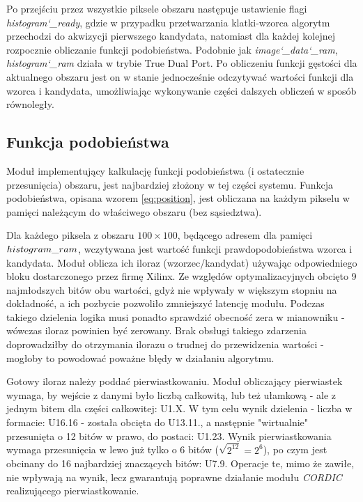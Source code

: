 Po przejściu przez wszystkie piksele obszaru następuje ustawienie flagi \textit{histogram\char`_ready}, gdzie w przypadku przetwarzania klatki-wzorca algorytm przechodzi do akwizycji pierwszego kandydata, natomiast dla każdej kolejnej rozpocznie obliczanie funkcji podobieństwa.
Podobnie jak \textit{image\char`_data\char`_ram}, \textit{histogram\char`_ram} działa w trybie True Dual Port. Po obliczeniu funkcji gęstości dla aktualnego obszaru jest on w stanie jednocześnie odczytywać wartości funkcji dla wzorca i kandydata, umożliwiając wykonywanie części dalszych obliczeń w sposób równoległy.

\subsection{Funkcja podobieństwa}
Moduł implementujący kalkulację funkcji podobieństwa (i ostatecznie przesunięcia) obszaru, jest najbardziej złożony w tej części systemu. Funkcja podobieństwa, opisana wzorem \ref{eq:position}, jest obliczana na każdym pikselu w pamięci należącym do właściwego obszaru (bez sąsiedztwa).

Dla każdego piksela z obszaru $100 \times 100$, będącego adresem dla pamięci $histogram\char`_ram$, wczytywana jest wartość funkcji prawdopodobieństwa wzorca i kandydata. Moduł oblicza ich iloraz (wzorzec/kandydat) używając odpowiedniego bloku dostarczonego przez firmę Xilinx. Ze względów optymalizacyjnych obcięto 9 najmłodszych bitów obu wartości, gdyż nie wpływały w większym stopniu na dokładność, a ich pozbycie pozwoliło zmniejszyć latencję modułu. Podczas takiego dzielenia logika musi ponadto sprawdzić obecność zera w mianowniku - wówczas iloraz powinien być zerowany. Brak obsługi takiego zdarzenia doprowadziłby do otrzymania ilorazu o trudnej do przewidzenia wartości - mogłoby to powodować poważne błędy w działaniu algorytmu. 

Gotowy iloraz należy poddać pierwiastkowaniu. Moduł obliczający pierwiastek wymaga, by wejście z danymi było liczbą całkowitą, lub  też ułamkową - ale z jednym bitem dla części całkowitej: U1.X. W tym celu wynik dzielenia - liczba w formacie: U16.16 - została obcięta do U13.11., a następnie "wirtualnie" przesunięta o 12 bitów w prawo, do postaci: U1.23. Wynik pierwiastkowania wymaga przesunięcia w lewo już tylko o 6 bitów ($\sqrt{2^{12}}=2^6$), po czym jest obcinany do 16 najbardziej znaczących bitów: U7.9.
Operacje te, mimo że zawiłe, nie wpływają na wynik, lecz gwarantują poprawne działanie modułu \textit{CORDIC} realizującego pierwiastkowanie.

